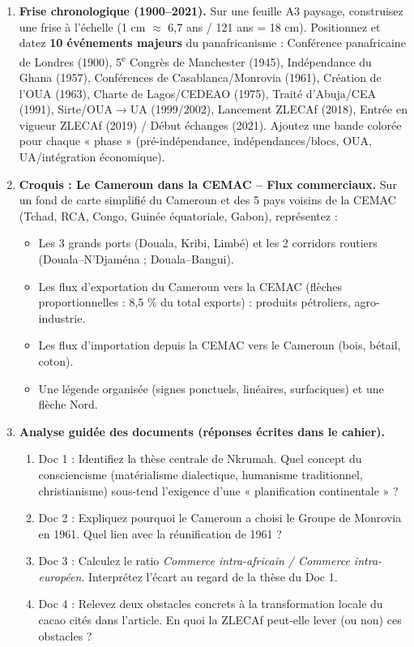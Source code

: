 \documentclass[11pt]{article}
\begin{document}
\begin{enumerate}
    \item \textbf{Frise chronologique (1900--2021).} Sur une feuille A3 paysage, construisez une frise à l'échelle (1 cm $\approx$ 6,7 ans / 121 ans = 18 cm). Positionnez et datez \textbf{10 événements majeurs} du panafricanisme : Conférence panafricaine de Londres (1900), 5\textsuperscript{e} Congrès de Manchester (1945), Indépendance du Ghana (1957), Conférences de Casablanca/Monrovia (1961), Création de l'OUA (1963), Charte de Lagos/CEDEAO (1975), Traité d'Abuja/CEA (1991), Sirte/OUA$\rightarrow$UA (1999/2002), Lancement ZLECAf (2018), Entrée en vigueur ZLECAf (2019) / Début échanges (2021). Ajoutez une bande colorée pour chaque « phase » (pré-indépendance, indépendances/blocs, OUA, UA/intégration économique).
    
    \item \textbf{Croquis : Le Cameroun dans la CEMAC – Flux commerciaux.} Sur un fond de carte simplifié du Cameroun et des 5 pays voisins de la CEMAC (Tchad, RCA, Congo, Guinée équatoriale, Gabon), représentez :
    \begin{itemize}
        \item Les 3 grands ports (Douala, Kribi, Limbé) et les 2 corridors routiers (Douala–N'Djaména ; Douala–Bangui).
        \item Les flux d'exportation du Cameroun vers la CEMAC (flèches proportionnelles : 8,5 \% du total exports) : produits pétroliers, agro-industrie.
        \item Les flux d'importation depuis la CEMAC vers le Cameroun (bois, bétail, coton).
        \item Une légende organisée (signes ponctuels, linéaires, surfaciques) et une flèche Nord.
    \end{itemize}
    
    \item \textbf{Analyse guidée des documents (réponses écrites dans le cahier).}
    \begin{enumerate}
        \item Doc 1 : Identifiez la thèse centrale de Nkrumah. Quel concept du consciencisme (matérialisme dialectique, humanisme traditionnel, christianisme) sous-tend l'exigence d'une « planification continentale » ?
        \item Doc 2 : Expliquez pourquoi le Cameroun a choisi le Groupe de Monrovia en 1961. Quel lien avec la réunification de 1961 ?
        \item Doc 3 : Calculez le ratio \emph{Commerce intra-africain / Commerce intra-européen}. Interprétez l'écart au regard de la thèse du Doc 1.
        \item Doc 4 : Relevez deux obstacles concrets à la transformation locale du cacao cités dans l'article. En quoi la ZLECAf peut-elle lever (ou non) ces obstacles ?
    \end{enumerate}
    

\end{enumerate}
\end{document}
